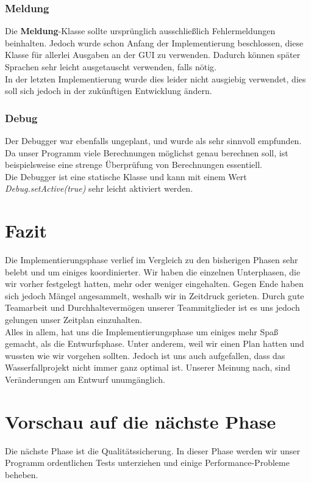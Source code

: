 \documentclass[12pt,a4paper,titlepage]{article}
\newcommand{\myma}{\fontfamily{pcr}\selectfont \textbf}
\newcommand{\mymo}{\fontfamily{pcr}\selectfont \textit}
\begin{document}
\subsubsection{Meldung}
Die {\myma{Meldung}}-Klasse sollte ursprünglich ausschließlich Fehlermeldungen beinhalten. Jedoch wurde schon Anfang der Implementierung beschlossen, diese Klasse für allerlei Ausgaben an der GUI zu verwenden. Dadurch können später Sprachen sehr leicht ausgetauscht verwenden, falls nötig. \\
In der letzten Implementierung wurde dies leider nicht ausgiebig verwendet, dies soll sich jedoch in der zukünftigen Entwicklung ändern.

\subsubsection{Debug}
Der Debugger war ebenfalls ungeplant, und wurde als sehr sinnvoll empfunden. Da unser Programm viele Berechnungen möglichst genau berechnen soll, ist beispielsweise eine strenge Überprüfung von Berechnungen essentiell. \\
Die Debugger ist eine statische Klasse und kann mit einem Wert {\mymo{Debug.setActive(true)}} sehr leicht aktiviert werden.

\section{Fazit}
Die Implementierungsphase verlief im Vergleich zu den bisherigen Phasen sehr belebt und um einiges koordinierter. Wir haben die einzelnen Unterphasen, die wir vorher festgelegt hatten, mehr oder weniger eingehalten. Gegen Ende haben sich jedoch Mängel angesammelt, weshalb wir in Zeitdruck gerieten. Durch gute Teamarbeit und Durchhaltevermögen unserer Teammitglieder ist es uns jedoch gelungen unser Zeitplan einzuhalten. \\
Alles in allem, hat uns die Implementierungsphase um einiges mehr Spaß gemacht, als die Entwurfsphase. Unter anderem, weil wir einen Plan hatten und wussten wie wir vorgehen sollten. Jedoch ist uns auch aufgefallen, dass das Wasserfallprojekt nicht immer ganz optimal ist. Unserer Meinung nach, sind Veränderungen am Entwurf unumgänglich.

\newpage
\section{Vorschau auf die nächste Phase}
Die nächste Phase ist die Qualitätssicherung. In dieser Phase werden wir unser Programm ordentlichen Tests unterziehen und einige Performance-Probleme beheben.
\end{document}

